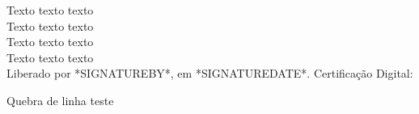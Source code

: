 \documentclass[12pt]{article}
\begin{document}
Texto texto texto \\
Texto texto texto \\
Texto texto texto \\
Texto texto texto \\

\small{Liberado por *SIGNATUREBY*, em *SIGNATUREDATE*.}\hfill\break
\small{Certificação Digital:}\hfill\break

\newpage

Quebra de linha teste
\end{document}
